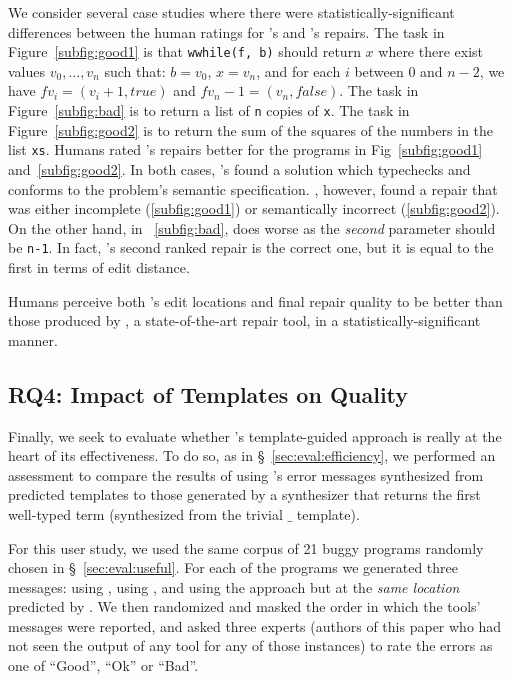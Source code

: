 %
We consider several case studies where there were
statistically-significant differences between
the human ratings for \toolname's and \seminal's
repairs.
%
The task in Figure~\ref{subfig:good1} is that
\texttt{wwhile(f, b)} should return $x$ where
there exist values $v_0,...,v_n$ such that:
$b = v_0$, $x = v_n$, and for each $i$ between
0 and $n-2$, we have $f v_i = (v_i+1, true)$
and $f v_n-1 = (v_n, false)$.
%
The task in Figure~\ref{subfig:bad} is to
return a list of \texttt{n} copies of \texttt{x}.
%
The task in Figure~\ref{subfig:good2} is to
return the sum of the squares of the numbers
in the list \texttt{xs}.
%
Humans rated \toolname's repairs better
for the programs in Fig~\ref{subfig:good1}
and~\ref{subfig:good2}.
%
In both cases, \toolname's found a solution
which typechecks and conforms to the problem's
semantic specification.
%
\seminal, however, found a repair that was
either incomplete (\ref{subfig:good1}) or
semantically incorrect (\ref{subfig:good2}).
On the other hand, in ~\ref{subfig:bad}, \toolname
does worse as the \emph{second} parameter should
be \verb|n-1|. In fact, \toolname's second ranked
repair is the correct one, but it is equal
to the first in terms of edit distance.

\begin{framed}
\noindent Humans perceive both \toolname's edit locations
 and final repair quality to be better than those produced
 by \seminal, a state-of-the-art \ocaml repair tool, in a
 statistically-significant manner.
\end{framed}

\subsection{RQ4: Impact of Templates on Quality}
\label{sec:eval:template_quality}

Finally, we seek to evaluate whether \toolname's template-guided
approach is really at the heart of its effectiveness. To do so,
as in \S~\ref{sec:eval:efficiency}, we performed an assessment
to compare the results of using \toolname's error messages
synthesized from predicted templates to those generated by
a \naive synthesizer that returns the first well-typed term
(\ie synthesized from the trivial $\_$ template).

%
For this user study, we used the same corpus of 21 buggy programs
randomly chosen in \S~\ref{sec:eval:useful}. For each of the
programs we generated three messages: using \toolname, using \seminal,
and using the \naive approach but at the \emph{same location} predicted
by \toolname. We then randomized and masked the order in which the tools'
messages were reported, and asked three experts (authors of this paper who
had not seen the output of any tool for any of those instances)
to rate the errors as one of ``Good'', ``Ok'' or ``Bad''.

